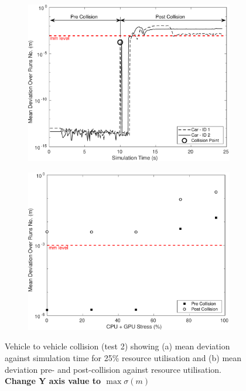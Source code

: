 \documentclass[letterpaper, 10 pt, journal, twoside]{IEEEtran}
\begin{document}
\begin{figure}[h]
    \centering
    \begin{subfigure}{.49\textwidth}
        \includegraphics[width=1\textwidth]{Other/Figures/CarsCollisionCG25.pdf}
        \caption{}
        \label{CarsCollisionCG25}
    \end{subfigure}
    \begin{subfigure}{.49\textwidth}
        \includegraphics[width=1\textwidth]{Other/Figures/CarsCollisionPrePost.pdf}
        \caption{}
        \label{CarsCollisionPrePost}
    \end{subfigure}
    \caption{Vehicle to vehicle collision (test 2) showing (a) mean deviation against simulation time for 25\% resource utilisation and (b) mean deviation pre- and post-collision against resource utilisation. \textbf{Change Y axis value to $\max\sigma (m)$}}
\end{figure}
\end{document}
